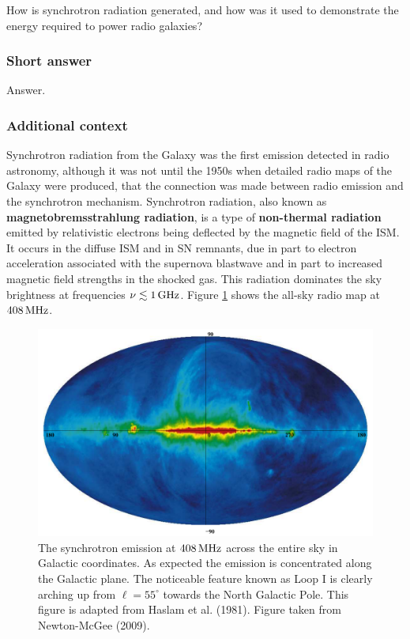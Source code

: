 \documentclass[a4paper,10pt]{article}
\begin{document}
How is synchrotron radiation generated, and how was it used to demonstrate the energy required to power radio galaxies?

\subsubsection{Short answer}

Answer.

\subsubsection{Additional context}

Synchrotron radiation from the Galaxy was the first emission detected in radio astronomy, although it was not until the 1950s when detailed radio maps of the Galaxy were produced, that the connection was made between radio emission and the synchrotron mechanism. Synchrotron radiation, also known as \textbf{magnetobremsstrahlung radiation}, is a type of \textbf{non-thermal radiation} emitted by relativistic electrons being deflected by the magnetic field of the ISM. It occurs in the diffuse ISM and in SN remnants, due in part to electron acceleration associated with the supernova blastwave and in part to increased magnetic field strengths in the shocked gas. This radiation dominates the sky brightness at frequencies $\nu\lesssim1\,{\rm GHz}$. Figure \ref{fig:haslam408} shows the all-sky radio map at $408\,{\rm MHz}$.

\begin{figure}[h]
    \centering
    \includegraphics[width=12cm]{figures/Haslam408.png}
    \caption{\footnotesize{The synchrotron emission at $408\,{\rm MHz}$ across the entire sky in Galactic coordinates. As expected the emission is concentrated along the Galactic plane. The noticeable feature known as Loop I is clearly arching up from $\ell=55^\circ$ towards the North Galactic Pole. This figure is adapted from Haslam et al. (1981). Figure taken from Newton-McGee (2009).}}
    \label{fig:haslam408}
\end{figure}
\end{document}
